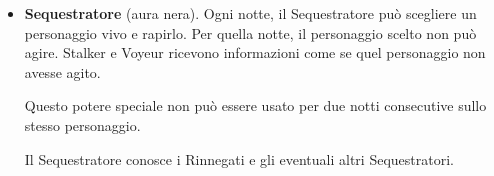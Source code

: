 \documentclass[a4paper,10pt]{article}
\begin{document}
\begin{itemize}
 \item {\bf Sequestratore} (aura nera). Ogni notte, il Sequestratore può scegliere un personaggio vivo e rapirlo. Per quella notte, il personaggio scelto non può agire.
 Stalker e Voyeur ricevono informazioni come se quel personaggio non avesse agito.
 
 Questo potere speciale non può essere usato per due notti consecutive sullo stesso personaggio.
 
 Il Sequestratore conosce i Rinnegati e gli eventuali altri Sequestratori.


\end{itemize}
\end{document}
